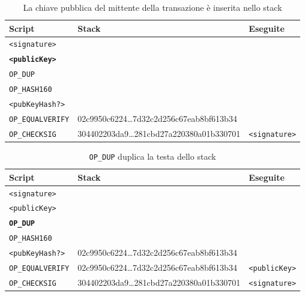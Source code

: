\begin{enumerate}[1.]
\begin{table}[H]
    \centering
    \begin{tabular}{p{3cm}|p{7.7cm}|p{3cm}}
        Script & Stack & Eseguite\\
        \hline
        \texttt{<signature>}          & &\\
        \texttt{\textbf{<publicKey>}} & &\\
        \texttt{OP\_DUP}              & &\\
        \texttt{OP\_HASH160}          & &\\
        \texttt{<pubKeyHash?>}        & &\\
        \texttt{OP\_EQUALVERIFY}      & 02c9950c6224\dots7d32c2d256c67eab8bf613b34 &\\
        \texttt{OP\_CHECKSIG}         & 304402203da9\dots281cbd27a220380a01b330701 & \texttt{<signature>}\\
    \end{tabular}
    \caption{La chiave pubblica del mittente della transazione è inserita nello stack}
\end{table}

\begin{table}[H]
    \centering
    \begin{tabular}{p{3cm}|p{7.7cm}|p{3cm}}
        Script & Stack & Eseguite\\
        \hline
        \texttt{<signature>}          & &\\
        \texttt{<publicKey>}          & &\\
        \texttt{\textbf{OP\_DUP}}     & &\\
        \texttt{OP\_HASH160}          & &\\
        \texttt{<pubKeyHash?>}        & 02c9950c6224\dots7d32c2d256c67eab8bf613b34 &\\
        \texttt{OP\_EQUALVERIFY}      & 02c9950c6224\dots7d32c2d256c67eab8bf613b34 & \texttt{<publicKey>}\\
        \texttt{OP\_CHECKSIG}         & 304402203da9\dots281cbd27a220380a01b330701 & \texttt{<signature>}\\
    \end{tabular}
    \caption{\texttt{OP\_DUP} duplica la testa dello stack}
\end{table}


\end{enumerate}
